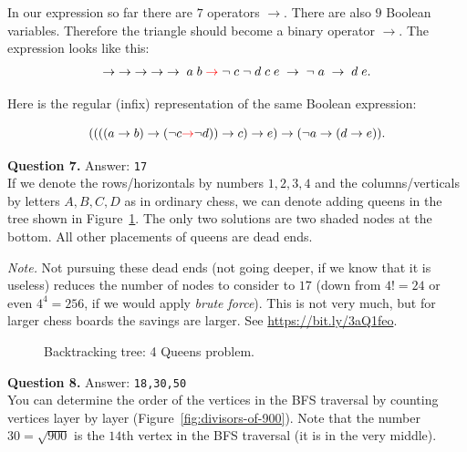 \documentclass[jou]{apa6}
\begin{document}
In our expression so far there are $7$ operators $\rightarrow$. There are also $9$ Boolean variables. 
Therefore the triangle should become a binary operator $\rightarrow$. 
The expression looks like this: 
$$\rightarrow\;\rightarrow\;\rightarrow\;\rightarrow\;\rightarrow\;a\;b\;\textcolor{red}{\rightarrow}\;\neg\;c\;\neg\;d\;c\;e\;\rightarrow\;\neg\;a\;\rightarrow\;d\;e.$$

Here is the regular (infix) representation of the same Boolean expression:

{\footnotesize
$$((((a \rightarrow b) \rightarrow (\neg c \textcolor{red}{\rightarrow} \neg d)) \rightarrow c) \rightarrow e) 
  \rightarrow (\neg a \rightarrow (d \rightarrow e)).$$
}

\vspace{4pt}
{\bf Question 7.} Answer: {\tt 17}\\

If we denote the rows/horizontals by numbers $1,2,3,4$ and the columns/verticals by letters $A,B,C,D$
as in ordinary chess, we can denote adding queens in the tree shown in Figure~\ref{fig:backtracking-4-queens}. 
The only two solutions are two shaded nodes at the bottom. All other placements of queens are 
dead ends. 

{\em Note.} Not pursuing these dead ends (not going deeper, if we know that it is useless) 
reduces the number of nodes to consider to $17$ (down from $4! = 24$ or even $4^4 = 256$, if we would
apply {\em brute force}). This is not very much, but for larger chess boards the savings are larger.
See \url{https://bit.ly/3aQ1feo}.

\begin{figure}[!htb]
\caption{\label{fig:backtracking-4-queens} Backtracking tree: 4 Queens problem.}
\end{figure}


\vspace{4pt}
{\bf Question 8.} Answer: {\tt 18,30,50} \\

You can determine the order of the vertices in the BFS traversal by counting vertices
layer by layer (Figure~\ref{fig:divisors-of-900}). 
Note that the number $30 = \sqrt{900}$ is the $14$th vertex in the BFS traversal (it is in the very middle). 
\end{document}
